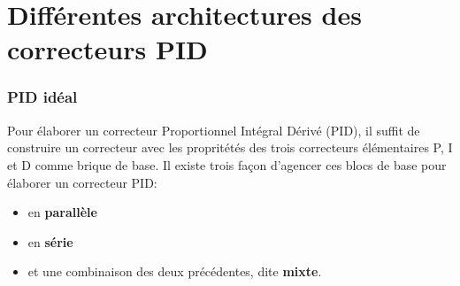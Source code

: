 \chapter[Correcteur PID]
{Différentes architectures des correcteurs PID\label{annexe-pid}}
\subsection*{PID idéal}
Pour élaborer un correcteur Proportionnel Intégral Dérivé (PID), il suffit
de construire un correcteur avec les propritétés des trois correcteurs 
élémentaires P, I et D comme brique de base. Il existe trois façon d'agencer
ces blocs de base pour élaborer un correcteur PID:
\begin{itemize}
    \item en \textbf{parallèle}
    \item en \textbf{série}
    \item et une combinaison des deux précédentes, dite \textbf{mixte}.
\end{itemize}
